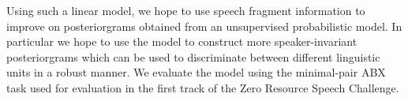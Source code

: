 Using such a linear model, we hope to use speech fragment information to improve on posteriorgrams obtained from an unsupervised probabilistic model.
In particular we hope to use the model to construct more speaker-invariant posteriorgrams which can be used to discriminate between different linguistic units in a robust manner.
We evaluate the model using the minimal-pair ABX task used for evaluation in the first track of the Zero Resource Speech Challenge.
